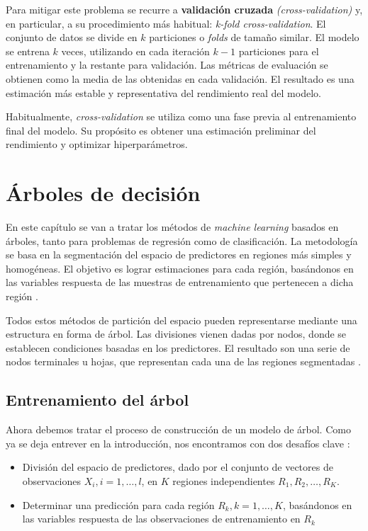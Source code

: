 \documentclass[titlepage, 11pt]{book}
\begin{document}
Para mitigar este problema se recurre a \textbf{validación cruzada} \textit{(cross-validation)} y, en particular, a su procedimiento más habitual: \textit{k-fold cross-validation}. El conjunto de datos se divide en $k$ particiones o \textit{folds} de tamaño similar. El modelo se entrena $k$ veces, utilizando en cada iteración $k-1$ particiones para el entrenamiento y la restante para validación. Las métricas de evaluación se obtienen como la media de las obtenidas en cada validación. El resultado es una estimación más estable y representativa del rendimiento real del modelo.

Habitualmente, \textit{cross-validation} se utiliza como una fase previa al entrenamiento final del modelo. Su propósito es obtener una estimación preliminar del rendimiento y optimizar hiperparámetros.

\chapter{Árboles de decisión}
En este capítulo se van a tratar los métodos de \textit{machine learning} basados en árboles, tanto para problemas de regresión como de clasificación. La metodología se basa en la segmentación del espacio de predictores en regiones más simples y homogéneas. El objetivo es lograr estimaciones para cada región, basándonos en las variables respuesta de las muestras de entrenamiento que pertenecen a dicha región \cite{ISLP}.

Todos estos métodos de partición del espacio pueden representarse mediante una estructura en forma de árbol. Las divisiones vienen dadas por nodos, donde se establecen condiciones basadas en los predictores. El resultado son una serie de nodos terminales u hojas, que representan cada una de las regiones segmentadas \cite{ISLP}.


\section{Entrenamiento del árbol} \label{sec:TreeTrain}
Ahora debemos tratar el proceso de construcción de un modelo de árbol. Como ya se deja entrever en la introducción, nos encontramos con dos desafíos clave \cite{ISLP}:
\begin{itemize}
    \item División del espacio de predictores, dado por el conjunto de vectores de observaciones \(X_i, i=1,\ldots,l\), en \(K\) regiones independientes \(R_1, R_2, \ldots, R_K\).
    \item Determinar una predicción para cada región $R_k, k=1,\ldots,K$, basándonos en las variables respuesta de las observaciones de entrenamiento en $R_k$
\end{itemize}
\end{document}
